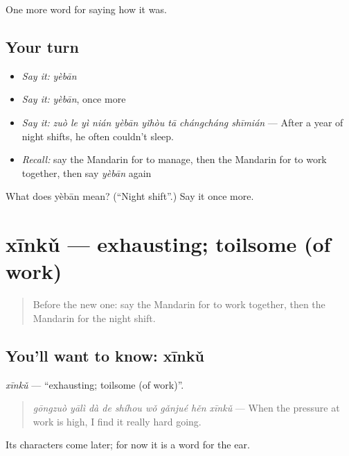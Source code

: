 \begin{grammarlens}[title={What you've built}]
One more word for saying how it was.
\end{grammarlens}

\subsection*{Your turn}
\begin{itemize}
\raggedright
  \item \emph{Say it:} \emph{yèbān}
  \item \emph{Say it:} \emph{yèbān}, once more
  \item \emph{Say it:} \emph{zuò le yì nián yèbān yǐhòu tā chángcháng shīmián} — After a year of night shifts, he often couldn't sleep.
  \item \emph{Recall:} say the Mandarin for to manage, then the Mandarin for to work together, then say \emph{yèbān} again
\end{itemize}

\begin{tcolorbox}[breakable,colback=teal!4,colframe=teal!35!black,title={Before you move on}]
What does yèbān mean? (\textquotedblleft{}Night shift\textquotedblright{}.) Say it once more.
\end{tcolorbox}
\section[xīnkǔ]{xīnkǔ — exhausting; toilsome (of work)}

\label{lesson:ZH-C490-xinku}



\begin{quote}
Before the new one: say the Mandarin for to work together, then the Mandarin for the night shift.
\end{quote}

\subsection*{You'll want to know: xīnkǔ}
\emph{xīnkǔ} — \textquotedblleft{}exhausting; toilsome (of work)\textquotedblright{}.

\begin{quote}
\emph{gōngzuò yālì dà de shíhou wǒ gǎnjué hěn xīnkǔ} — When the pressure at work is high, I find it really hard going.
\end{quote}

Its characters come later; for now it is a word for the ear.

